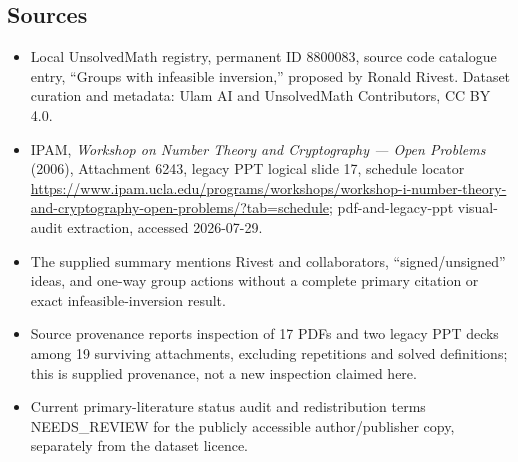 \documentclass[11pt]{article}
\begin{document}
\subsection{Sources}
\begin{itemize}
\item Local UnsolvedMath registry, permanent ID 8800083, source code catalogue entry, ``Groups with infeasible inversion,'' proposed by Ronald Rivest. Dataset curation and metadata: Ulam AI and UnsolvedMath Contributors, CC BY 4.0.
\item IPAM, \emph{Workshop on Number Theory and Cryptography --- Open Problems} (2006), Attachment 6243, legacy PPT logical slide 17, schedule locator \url{https://www.ipam.ucla.edu/programs/workshops/workshop-i-number-theory-and-cryptography-open-problems/?tab=schedule}; pdf-and-legacy-ppt visual-audit extraction, accessed 2026-07-29.
\item The supplied summary mentions Rivest and collaborators, ``signed/unsigned'' ideas, and one-way group actions without a complete primary citation or exact infeasible-inversion result.
\item Source provenance reports inspection of 17 PDFs and two legacy PPT decks among 19 surviving attachments, excluding repetitions and solved definitions; this is supplied provenance, not a new inspection claimed here.
\item Current primary-literature status audit and redistribution terms NEEDS\_REVIEW for the publicly accessible author/publisher copy, separately from the dataset licence.
\end{itemize}
\end{document}
